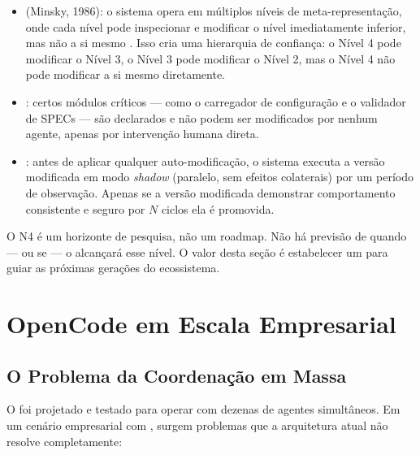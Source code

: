\begin{itemize}
    \item {} (Minsky, 1986):
    o sistema opera em múltiplos níveis de meta-representação, onde
    cada nível pode inspecionar e modificar o nível imediatamente
    inferior, mas não a si mesmo \cite{minsky1986society}. Isso
    cria uma hierarquia de confiança: o Nível 4 pode modificar o
    Nível 3, o Nível 3 pode modificar o Nível 2, mas o Nível 4 não
    pode modificar a si mesmo diretamente.

    \item {}: certos
    módulos críticos --- como o carregador de configuração e o
    validador de SPECs --- são declarados  e
    não podem ser modificados por nenhum agente, apenas por
    intervenção humana direta.

    \item {}: antes de aplicar qualquer
    auto-modificação, o sistema executa a versão modificada em modo
    \textit{shadow} (paralelo, sem efeitos colaterais) por um período
    de observação. Apenas se a versão modificada demonstrar
    comportamento consistente e seguro por $N$ ciclos ela é promovida.
\end{itemize}

\begin{observacao}
O N4 é um horizonte de pesquisa, não um roadmap. Não há previsão de
quando --- ou se --- o \opencodeeco{} alcançará esse nível. O valor
desta seção é estabelecer um  para guiar
as próximas gerações do ecossistema.
\end{observacao}

\section{OpenCode em Escala Empresarial}
\label{sec:escala-empresarial}
\nivelavancado

\subsection{O Problema da Coordenação em Massa}

O \opencodeeco{} foi projetado e testado para operar com dezenas de
agentes simultâneos. Em um cenário empresarial com , surgem problemas que a arquitetura atual não
resolve completamente:

